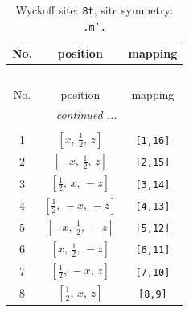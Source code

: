 \documentclass[fleqn,8pt]{jsarticle}
\begin{document}
\renewcommand{\arraystretch}{1.2}
\begin{longtable}{ccc}
\caption{Wyckoff site: {\tt 8t}, site symmetry: {\tt .m'.}}
 \\
 \hline \hline
No. & position & mapping \\ \hline \endfirsthead

\multicolumn{2}{l}{\tablename\ \thetable{}} \\
 \hline \hline
No. & position & mapping \\ \hline \endhead

 \hline \hline
\multicolumn{2}{r}{\footnotesize\it continued ...} \\ \endfoot

 \hline \hline
\multicolumn{2}{r}{} \\ \endlastfoot

1 & $\left[ x,\, \frac{1}{2},\, z \right]$ & {\tt [1,16]} \\ \hline
2 & $\left[ - x,\, \frac{1}{2},\, z \right]$ & {\tt [2,15]} \\ \hline
3 & $\left[ \frac{1}{2},\, x,\, - z \right]$ & {\tt [3,14]} \\ \hline
4 & $\left[ \frac{1}{2},\, - x,\, - z \right]$ & {\tt [4,13]} \\ \hline
5 & $\left[ - x,\, \frac{1}{2},\, - z \right]$ & {\tt [5,12]} \\ \hline
6 & $\left[ x,\, \frac{1}{2},\, - z \right]$ & {\tt [6,11]} \\ \hline
7 & $\left[ \frac{1}{2},\, - x,\, z \right]$ & {\tt [7,10]} \\ \hline
8 & $\left[ \frac{1}{2},\, x,\, z \right]$ & {\tt [8,9]} \\
\end{longtable}
\renewcommand{\arraystretch}{1.2}
\end{document}
